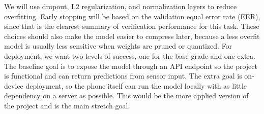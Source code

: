 We will use dropout, L2 regularization, and normalization layers to reduce overfitting. Early stopping will be based on the validation equal error rate (EER), since that is the clearest summary of verification performance for this task. These choices should also make the model easier to compress later, because a less overfit model is usually less sensitive when weights are pruned or quantized. For deployment, we want two levels of success, one for the base grade and one extra. The baseline goal is to expose the model through an API endpoint so the project is functional and can return predictions from sensor input. The extra goal is on-device deployment, so the phone itself can run the model locally with as little dependency on a server as possible. This would be the more applied version of the project and is the main stretch goal.
